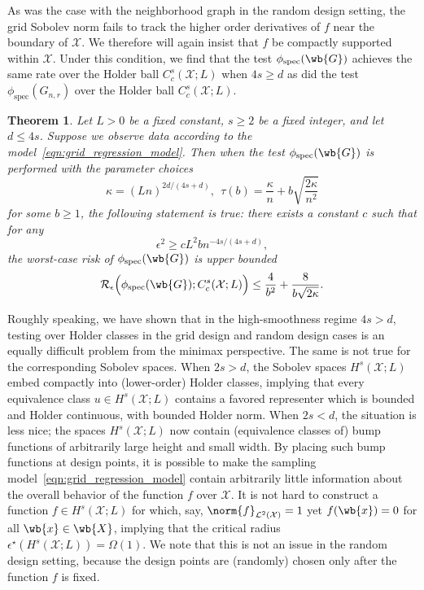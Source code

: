 \documentclass{article}
\newcommand{\1}{\mathbf{1}}
\newcommand{\Xset}{\mathcal{X}}
\newcommand{\Leb}{\mathcal{L}}
\newcommand{\spec}{\mathrm{spec}}
\theoremstyle{alden}
\theoremstyle{aldenthm}
\newtheorem{theorem}{Theorem}
\theoremstyle{definition}
\theoremstyle{remark}
\begin{document}
As was the case with the neighborhood graph in the random design setting, the grid Sobolev norm fails to track the higher order derivatives of $f$ near the boundary of $\Xset$. We therefore will again insist that $f$ be compactly supported within $\Xset$. Under this condition, we find that the test $\phi_{\spec}(\wb{G})$ achieves the same rate over the Holder ball $C_c^{s}(\Xset;L)$ when $4s \geq d$ as did the test $\phi_{\spec}(G_{n,r})$ over the Holder ball $C_c^s(\Xset;L)$.

\begin{theorem}
	\label{thm:holder_testing_rate_grid_higher_order}
	Let $L > 0$ be a fixed constant, $s \geq 2$ be a fixed integer, and let $d \leq 4s$.  Suppose we observe data according to the model~\eqref{eqn:grid_regression_model}. Then when the test $\phi_{\spec}(\wb{G})$ is performed with the parameter choices
	\begin{equation*}
	\kappa = (Ln)^{2d/(4s + d)},~~ \tau(b) =  \frac{\kappa}{n} + b\sqrt{\frac{2\kappa}{n^2}}
	\end{equation*} 
	for some $b \geq 1$, the following statement is true: there exists a constant $c$ such that for any
	\begin{equation*}
	\epsilon^2 \geq c L^2 b n^{-4s/(4s + d)},
	\end{equation*}
	the worst-case risk of $\phi_{\spec}(\wb{G})$ is upper bounded
	\begin{equation*}
	\mathcal{R}_{\epsilon}\Bigl(\phi_{\spec}(\wb{G});C_c^{s}(\Xset;L)\Bigr) \leq \frac{4}{b^2} + \frac{8}{b\sqrt{2\kappa}}.
	\end{equation*}
\end{theorem}

Roughly speaking, we have shown that in the high-smoothness regime $4s > d$, testing over Holder classes in the grid design and random design cases is an equally difficult problem from the minimax perspective. The same is not true for the corresponding Sobolev spaces. When $2s > d$, the Sobolev spaces $H^s(\Xset;L)$ embed compactly into (lower-order) Holder classes, implying that every equivalence class $u \in H^s(\Xset;L)$ contains a favored representer which is bounded and Holder continuous, with bounded Holder norm. When $2s < d$, the situation is less nice; the spaces $H^s(\Xset;L)$ now contain (equivalence classes of) bump functions of arbitrarily large height and small width. By placing such bump functions at design points, it is possible to make the sampling model~\eqref{eqn:grid_regression_model} contain arbitrarily little information about the overall behavior of the function $f$ over $\Xset$. It is not hard to construct a function $f \in H^s(\Xset;L)$ for which, say, $\norm{f}_{\Leb^2(\Xset)} = 1$ yet $f(\wb{x}) = 0$ for all $\wb{x} \in \wb{X}$, implying that the critical radius $\epsilon^{\star}(H^s(\Xset;L)) = \Omega(1)$. We note that this is not an issue in the random design setting, because the design points are (randomly) chosen only after the function $f$ is fixed.
\end{document}
